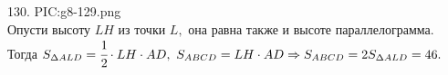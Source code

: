 130. {{PIC:g8-129.png}}\\
Опусти высоту $LH$ из точки $L,$ она равна также и высоте параллелограмма. Тогда $S_{\Delta ALD}=\cfrac{1}{2}\cdot LH\cdot AD,\ S_{ABCD}=LH\cdot AD\Rightarrow
S_{ABCD}=2S_{\Delta ALD}=46.$\newpage\noindent

